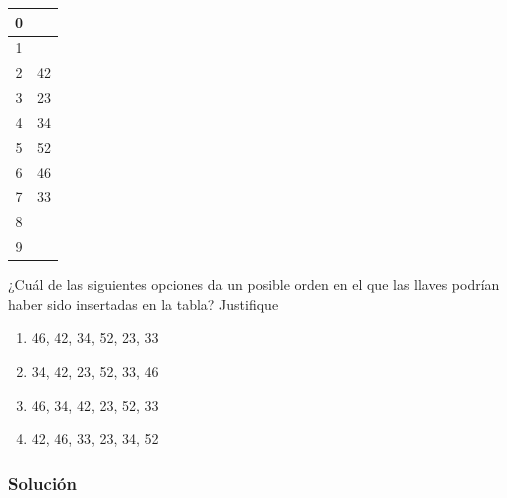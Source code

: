 \documentclass{article}
\begin{document}
\begin{tabular}{|c|c|}
    \hline
    0 &    \\ \hline
    1 &    \\ \hline
    2 & 42 \\ \hline
    3 & 23 \\ \hline
    4 & 34 \\ \hline
    5 & 52 \\ \hline
    6 & 46 \\ \hline
    7 & 33 \\ \hline
    8 &    \\ \hline
    9 &    \\ \hline
  \end{tabular}

¿Cuál de las siguientes opciones da un posible orden en el que las llaves podrían haber sido
insertadas en la tabla? Justifique
\begin{enumerate}[label=(\Alph*), ref=\Alph*]
    \item 46, 42, 34, 52, 23, 33
    \item 34, 42, 23, 52, 33, 46
    \item 46, 34, 42, 23, 52, 33
    \item 42, 46, 33, 23, 34, 52
\end{enumerate}
\subsubsection*{Solución}
\end{document}
